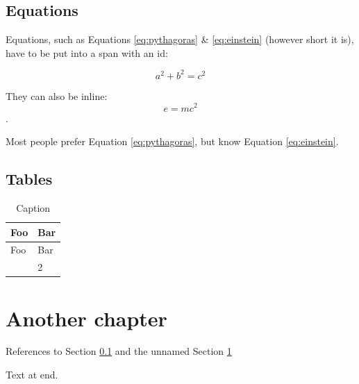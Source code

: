 \subsection{Equations}\label{equationchapter}

Equations, such as Equations \ref{eq:pythagoras} \& \ref{eq:einstein}
(however short it is), have to be put into a span with an id:

\label{eq:pythagoras}{\[a^2 + b^2 = c^2\]}

They can also be inline: \label{eq:einstein}{\[e=mc^2\]}.

Most people prefer Equation \ref{eq:pythagoras}, but know
Equation \ref{eq:einstein}.

\subsection{Tables}\label{tables}

\begin{longtable}[]{@{}ll@{}}
\caption{Caption}\label{tab:foobar}\tabularnewline
\toprule\noalign{}
Foo & Bar \\
\midrule\noalign{}
\endfirsthead
\toprule\noalign{}
Foo & Bar \\
\midrule\noalign{}
\endhead
\bottomrule\noalign{}
\endlastfoot
1 & 2 \\
\end{longtable}

\section{Another chapter}\label{another-chapter}

References to Section \ref{equationchapter} and the unnamed
Section \ref{another-chapter}

Text at end.
